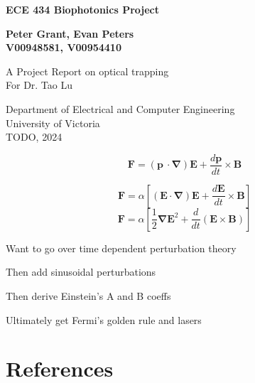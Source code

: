 \documentclass{article}
\begin{document}
\begin{titlepage}
    \begin{center}
        \vspace*{2cm}
 
        \huge
        \textbf{ECE 434 Biophotonics Project}
     
        \vspace{1.5cm}
        \Large
        \textbf{Peter Grant, Evan Peters\\
        V00948581, V00954410}
 
        \vfill
             
        A Project Report on optical trapping\\
        For Dr. Tao Lu     

        \vspace{0.8cm}
      

             
        Department of Electrical and Computer Engineering\\
        University of Victoria\\
        TODO, 2024
             
    \end{center}
\end{titlepage}

\[ \mathbf{F} = (\mathbf{p}\ \cdot\mathbf{\nabla})\mathbf{E} + \frac{d\mathbf{p}}{dt}\times\mathbf{B} \]


\[ \mathbf{F} = \alpha\left[ (\mathbf{E}\cdot\mathbf{\nabla})\mathbf{E} + \frac{d\mathbf{E}}{dt}\times\mathbf{B} \right]  \]
\[ \mathbf{F} = \alpha\left[ \frac{1}{2}\mathbf{\nabla}\mathbf{E}^2 + \frac{d}{dt}(\mathbf{E}\times\mathbf{B}) \right]  \]

Want to go over time dependent perturbation theory

Then add sinusoidal perturbations

Then derive Einstein's A and B coeffs

Ultimately get Fermi's golden rule and lasers


\newpage
\section*{References}

\end{document}
